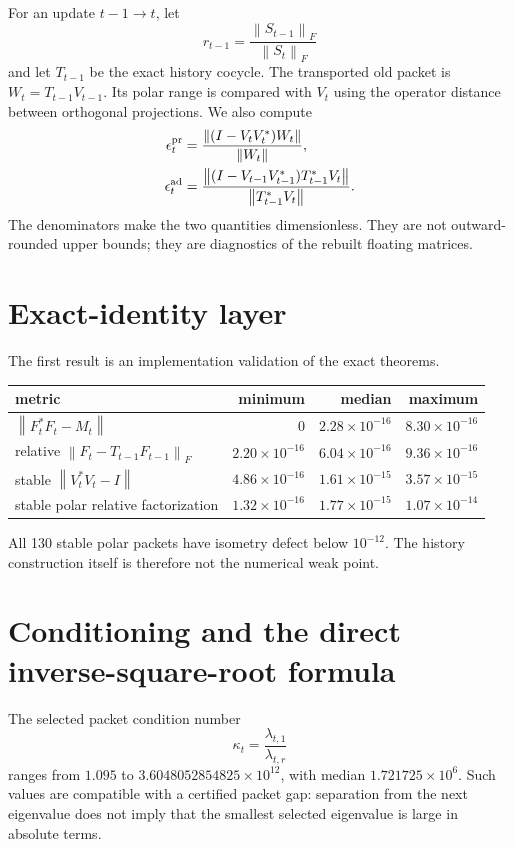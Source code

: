 \documentclass[12pt]{article}
\theoremstyle{remark}
\newcommand{\norm}[1]{\left\lVert#1\right\rVert}
\begin{document}
For an update $t-1\to t$, let
\[
 r_{t-1}=\frac{\norm{S_{t-1}}_F}{\norm{S_t}_F}
\]
and let $T_{t-1}$ be the exact history cocycle.  The transported old packet
is $W_t=T_{t-1}V_{t-1}$.  Its polar range is compared with $V_t$ using the
operator distance between orthogonal projections.  We also compute
\begin{align}
 \epsilon_t^{\rm pr}
 &=\frac{\norm{(I-V_tV_t^*)W_t}}
 {\norm{W_t}},\label{eq:primal}\\
 \epsilon_t^{\rm ad}
 &=\frac{\norm{(I-V_{t-1}V_{t-1}^*)T_{t-1}^*V_t}}
 {\norm{T_{t-1}^*V_t}}.\label{eq:adjoint}
\end{align}
The denominators make the two quantities dimensionless.  They are not
outward-rounded upper bounds; they are diagnostics of the rebuilt floating
matrices.

\section{Exact-identity layer}

The first result is an implementation validation of the exact theorems.
\begin{center}
\begin{tabular}{lrrr}
\toprule
metric & minimum & median & maximum\\
\midrule
$\norm{F_t^*F_t-M_t}$
& $0$ & $2.28\times10^{-16}$ & $8.30\times10^{-16}$\\
relative $\norm{F_t-T_{t-1}F_{t-1}}_F$
& $2.20\times10^{-16}$ & $6.04\times10^{-16}$ & $9.36\times10^{-16}$\\
stable $\norm{V_t^*V_t-I}$
& $4.86\times10^{-16}$ & $1.61\times10^{-15}$ & $3.57\times10^{-15}$\\
stable polar relative factorization
& $1.32\times10^{-16}$ & $1.77\times10^{-15}$ & $1.07\times10^{-14}$\\
\bottomrule
\end{tabular}
\end{center}
All 130 stable polar packets have isometry defect below $10^{-12}$.  The
history construction itself is therefore not the numerical weak point.

\section{Conditioning and the direct inverse-square-root formula}

The selected packet condition number
\[
 \kappa_t=\frac{\lambda_{t,1}}{\lambda_{t,r}}
\]
ranges from $1.095$ to $3.6048052854825\times10^{12}$, with median
$1.721725\times10^6$.  Such values are compatible with a certified packet
gap: separation from the next eigenvalue does not imply that the smallest
selected eigenvalue is large in absolute terms.
\end{document}
